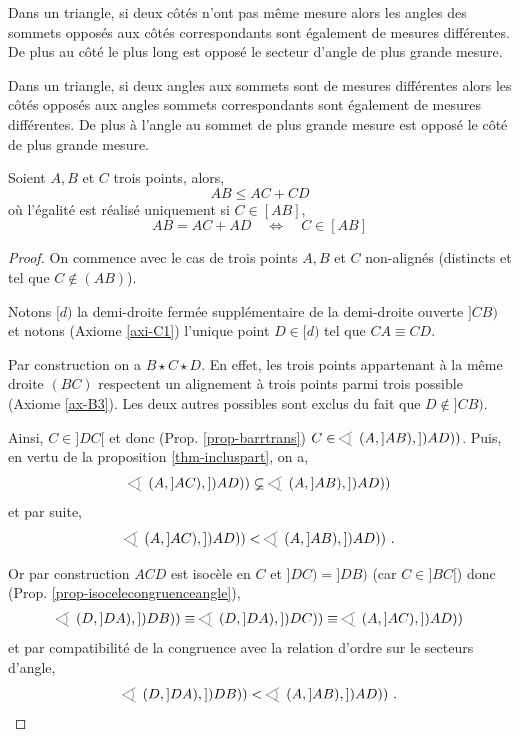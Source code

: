 \begin{lem}
Dans un triangle, si deux côtés n'ont pas même mesure alors les angles des sommets opposés aux côtés correspondants sont également de mesures différentes. De plus au côté le plus long est opposé le secteur d'angle de plus grande mesure. 
\end{lem}
\begin{lem}\label{lem-i3}
Dans un triangle, si deux angles aux sommets sont de mesures différentes alors les côtés opposés aux angles sommets correspondants sont également de mesures différentes. De plus à l'angle au sommet de plus grande mesure est opposé le côté de plus grande mesure.  
\end{lem}


\begin{thm}
Soient $A,B$ et $C$ trois points, alors,
\begin{equation*}
AB \leq AC + CD
\end{equation*}
où l'égalité est réalisé uniquement si $C\in [AB]$,
\begin{equation*}
    AB = AC + AD \quad \Longleftrightarrow \quad C\in [AB] 
\end{equation*}

\begin{proof}
On commence avec le cas de trois points $A,B$ et $C$ non-alignés (distincts et tel que $C\notin (AB)$). 

Notons $[d)$ la demi-droite fermée supplémentaire de la demi-droite ouverte $]CB)$ et notons (Axiome \ref{axi-C1}) l'unique point $D \in [d)$ tel que $CA\equiv CD$.  

Par construction on a $B\star C \star D$. En effet, les trois points appartenant à la même droite $(BC)$ respectent un alignement à trois points parmi trois possible (Axiome \ref{ax-B3}). Les deux autres possibles sont exclus du fait que $D \notin ]CB)$. 

Ainsi, $C \in ]DC[$ et donc (Prop. \ref{prop-barrtrans}) $C\in \anglesaillant \left( A,]AB),])AD)\right)$. Puis, en vertu de la proposition \ref{thm-incluspart}, on a,
\begin{equation*}
\anglesaillant \left( A,]AC),])AD)\right)\varsubsetneq \anglesaillant \left( A,]AB),])AD)\right)
\end{equation*}
et par suite,
\begin{equation*}
\anglesaillant \left( A,]AC),])AD)\right) < \anglesaillant \left( A,]AB),])AD)\right)\,.
\end{equation*}  

Or par construction $ACD$ est isocèle en $C$ et $]DC)=]DB)$ (car $C\in]BC[$) donc (Prop. \ref{prop-isocelecongruenceangle}),
 \begin{align*}
\anglesaillant \left( D,]DA),])DB)\right) \equiv \anglesaillant \left( D,]DA),])DC)\right)  \equiv \anglesaillant \left( A,]AC),])AD)\right) 
\end{align*}
et par compatibilité de la congruence avec la relation d'ordre sur le secteurs d'angle,
\begin{equation*}
    \anglesaillant \left( D,]DA),])DB)\right) < \anglesaillant \left( A,]AB),])AD)\right)\,.
\end{equation*}


\end{proof}
\end{thm}
